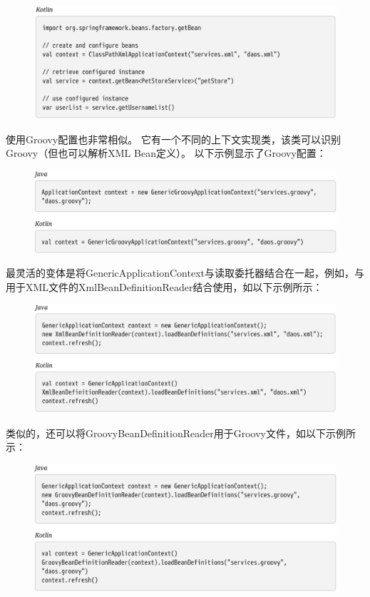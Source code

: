 \newpage
\begin{figure}[ht]
    \centering
    \includegraphics[width=1\linewidth]{./Figure/IMG_code_8.png}
\end{figure}

使用Groovy配置也非常相似。 
它有一个不同的上下文实现类，该类可以识别Groovy（但也可以解析XML Bean定义）。
 以下示例显示了Groovy配置：

 \begin{figure}[ht]
    \centering
    \includegraphics[width=1\linewidth]{./Figure/IMG_code_9.png}
\end{figure}

\newpage
最灵活的变体是将GenericApplicationContext与读取委托器结合在一起，例如，与用于XML文件的XmlBeanDefinitionReader结合使用，如以下示例所示：

\begin{figure}[ht]
    \centering
    \includegraphics[width=1\linewidth]{./Figure/IMG_code_10.png}
\end{figure}

类似的，还可以将GroovyBeanDefinitionReader用于Groovy文件，如以下示例所示：

\begin{figure}[ht]
    \centering
    \includegraphics[width=1\linewidth]{./Figure/IMG_code_11.png}
\end{figure}

